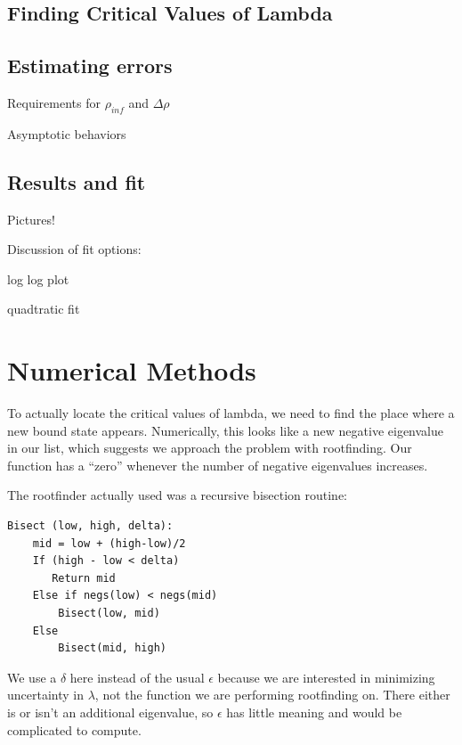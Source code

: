 \documentclass[12pt,twoside]{reedthesis}
\begin{document}
\section{Finding Critical Values of Lambda}

\section{Estimating errors}
Requirements for $\rho_{inf}$ and $\Delta \rho$

Asymptotic behaviors

\section{Results and fit}
Pictures!

Discussion of fit options:

log log plot

quadtratic fit


%
%
%	
%
\appendix
\chapter{Numerical Methods}
To actually locate the critical values of lambda, we need to find the place where a new bound state appears. Numerically, this looks like a new negative eigenvalue in our list, which suggests we approach the problem with rootfinding. Our function has a ``zero'' whenever the number of negative eigenvalues increases.

The rootfinder actually used was a recursive bisection routine:
\begin{verbatim}
Bisect (low, high, delta):
    mid = low + (high-low)/2
    If (high - low < delta)
       Return mid
    Else if negs(low) < negs(mid)
        Bisect(low, mid)
    Else 
        Bisect(mid, high)
\end{verbatim}
We use a $\delta$ here instead of the usual $\epsilon$ because we are interested in minimizing uncertainty in $\lambda$, not the function we are performing rootfinding on. There either is or isn't an additional eigenvalue, so $\epsilon$ has little meaning and would be complicated to compute.
\end{document}
